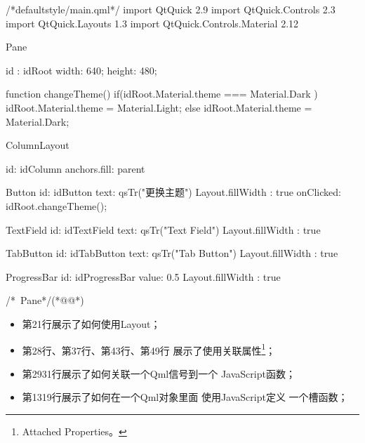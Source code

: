 \label{f000035}    %
\FloatBarrier                                  %
\begin{thebookfilesourceone}[escapeinside={(*@}{@*)},
caption=GoodLuck,
title=\filesourcenumbernameone \thefilesourcenumber
]
/*defaultstyle/main.qml*/
import QtQuick 2.9
import QtQuick.Controls 2.3
import QtQuick.Layouts 1.3
import QtQuick.Controls.Material 2.12

Pane {

    id : idRoot
    width: 640;
    height: 480;

    function changeTheme(){
        if(idRoot.Material.theme === Material.Dark ){
            idRoot.Material.theme = Material.Light;
        }else{
            idRoot.Material.theme = Material.Dark;
        }
    }

    ColumnLayout {
        id: idColumn
        anchors.fill: parent

        Button {
            id: idButton
            text: qsTr("更换主题")
            Layout.fillWidth : true
            onClicked: {
                idRoot.changeTheme();
            }
        }

        TextField {
            id: idTextField
            text: qsTr("Text Field")
            Layout.fillWidth : true
        }

        TabButton {
            id: idTabButton
            text: qsTr("Tab Button")
            Layout.fillWidth : true
        }

        ProgressBar {
            id: idProgressBar
            value: 0.5
            Layout.fillWidth : true
        }

    }

}/*~Pane*/(*@\marginpar[\hfill\setlength\fboxsep{2pt}\fbox{\footnotesize{\kaishu\parbox{1em}{\setlength{\baselineskip}{2pt}\filesourcenumbernameone}}\footnotesize{\thefilesourcenumber}}]{\setlength\fboxsep{2pt}\fbox{\footnotesize{\kaishu\parbox{1em}{\setlength{\baselineskip}{2pt}\filesourcenumbernameone}}\footnotesize{\thefilesourcenumber}}}@*)\end{thebookfilesourceone}          %
\addtocounter{lstlisting}{-1}   %

\begin{itemize}
\item 第21行展示了如何使用Layout；
\item 第28行、第37行、第43行、第49行
展示了使用关联属性\footnote{
Attached Properties。
}；
\item 第29\raisebox{0.16ex}{\sourcefonttwo\~{}}31行展示了如何关联一个Qml信号到一个
JavaScript函数；%
\item 第13\raisebox{0.16ex}{\sourcefonttwo\~{}}19行展示了如何在一个Qml对象里面
使用JavaScript定义
一个槽函数；
\end{itemize}


